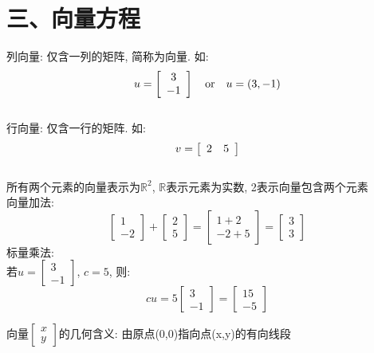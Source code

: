 \documentclass[UTF8,fontset=ubuntu]{ctexart}
\theoremstyle{plain}
\theoremstyle{nonumberplain}
\theoremstyle{empty}
\begin{document}
\section{三、向量方程}
列向量: 仅含一列的矩阵, 简称为向量. 如:
\[u=\left[\begin{array}{c}
	3\\
	-1
\end{array}\right] \text{\quad or\quad} u=(3, -1)\]\\[2ex]
行向量: 仅含一行的矩阵. 如:
\[v=\left[\begin{array}{c c}
	2 & 5
\end{array}\right]\]\\[2ex]
所有两个元素的向量表示为$\mathbb{R}^2$, $\mathbb{R}$表示元素为实数, 2表示向量包含两个元素\\
向量加法:
\begin{equation*}
\left[\begin{array}{c}
	1\\
	-2
\end{array}\right]
+
\left[\begin{array}{c}
	2\\
	5
\end{array}\right]
=
\left[\begin{array}{c}
	1+2\\
	-2+5
\end{array}\right]
=
\left[\begin{array}{c}
	3\\
	3
\end{array}\right]
\end{equation*}
标量乘法:\\
\indent 若$u=\left[\begin{array}{c}3\\-1\end{array}\right]$, $c=5$, 则:
\[cu=5\left[\begin{array}{c}3\\-1\end{array}\right]=\left[\begin{array}{c}15\\-5\end{array}\right]\]

向量$\left[\begin{array}{r}x\\y\end{array}\right]$的几何含义: 由原点(0,0)指向点(x,y)的有向线段\\[2ex]
\end{document}
